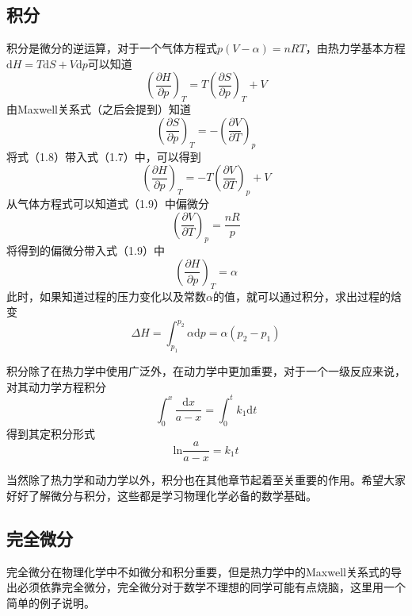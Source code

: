 \documentclass[lang=cn,newtx,10pt,scheme=chinese]{elegantbook}
\begin{document}
\subsection{积分}
积分是微分的逆运算，对于一个气体方程式$p(V-\alpha)=nRT$，由热力学基本方程$\mathrm{d}H=T\mathrm{d}S+V\mathrm{d}p$可以知道
\begin{equation}
	\left ( \frac{\partial H}{\partial p}  \right )_T=T\left ( \frac{\partial S}{\partial p}  \right )_T+V 
\end{equation}
由Maxwell关系式（之后会提到）知道
\begin{equation}
	\left ( \frac{\partial S}{\partial p}  \right )_T=-\left ( \frac{\partial V}{\partial T}  \right )_p 
\end{equation}
将式（1.8）带入式（1.7）中，可以得到
\begin{equation}
	\left ( \frac{\partial H}{\partial p}  \right )_T=-T \left ( \frac{\partial V}{\partial T}  \right )_p +V 
\end{equation}
从气体方程式可以知道式（1.9）中偏微分
\begin{equation}
	\left ( \frac{\partial V}{\partial T}  \right )_p=\frac{nR}{p} 
\end{equation}
将得到的偏微分带入式（1.9）中
\begin{equation}
	\left ( \frac{\partial H}{\partial p}  \right )_T=\alpha 
\end{equation}
此时，如果知道过程的压力变化以及常数$\alpha$的值，就可以通过积分，求出过程的焓变
\begin{equation}
	\Delta H=\int_{p_1}^{p_2} \alpha \mathrm{d}p=\alpha(p_2-p_1) 
\end{equation}

积分除了在热力学中使用广泛外，在动力学中更加重要，对于一个一级反应来说，对其动力学方程积分
\begin{equation}
	\int_{0}^{x} \frac{\mathrm{d}x }{a-x}=\int_{0}^{t}  k_1\mathrm{d}t 
\end{equation}
得到其定积分形式
\begin{equation}
	\mathrm{ln}\frac{a}{a-x}=k_1t  
\end{equation}

当然除了热力学和动力学以外，积分也在其他章节起着至关重要的作用。希望大家好好了解微分与积分，这些都是学习物理化学必备的数学基础。

\subsection{完全微分}
完全微分在物理化学中不如微分和积分重要，但是热力学中的Maxwell关系式的导出必须依靠完全微分，完全微分对于数学不理想的同学可能有点烧脑，这里用一个简单的例子说明。
\end{document}
